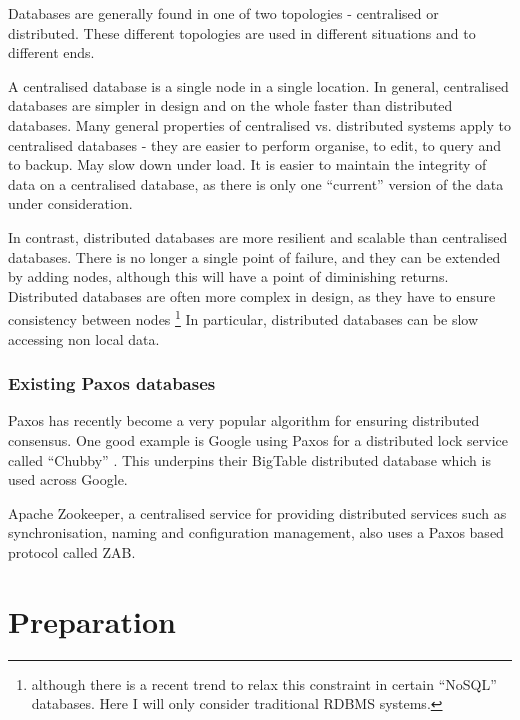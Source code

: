 \documentclass[12pt,twoside,notitlepage]{report}
\begin{document}
Databases are generally found in one of two topologies - centralised or distributed. These
different topologies are used in different situations and to different ends.

A centralised database is a single node in a single location.
In general, centralised databases are simpler in design and on the whole faster than distributed
databases.
Many general properties of centralised vs. distributed systems apply to centralised databases -
they are easier to perform organise, to edit, to query and to backup. May slow down under load. It
is easier to maintain the integrity of data on a centralised database, as there is only one
``current'' version of the data under consideration.

In contrast, distributed databases are more resilient and scalable than centralised databases.
There is no longer a single point of failure, and they can be extended by adding nodes, although
this will have a point of diminishing returns. Distributed databases are often more complex in
design, as they have to ensure consistency between nodes \footnote{although there is a recent trend to
relax this constraint in certain ``NoSQL'' databases. Here I will only consider traditional RDBMS
systems.} In particular, distributed databases can be slow accessing non local data.


\subsection*{Existing Paxos databases}

Paxos has recently become a very popular algorithm for ensuring distributed
consensus. One good example is Google using Paxos for a distributed lock
service called ``Chubby'' \cite{chandra07}. This underpins their BigTable
distributed database which is used across Google.

Apache Zookeeper, a centralised service for providing distributed services such
as synchronisation, naming and configuration management, also uses a Paxos
based protocol called ZAB.


\cleardoublepage

\chapter{Preparation}
\end{document}
